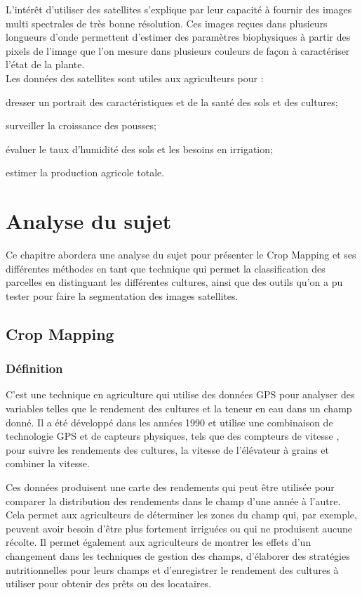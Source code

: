 \documentclass[12pt, openany]{report}
\begin{document}
L'intérêt d'utiliser des satellites s'explique par leur capacité à  fournir des images multi spectrales de très bonne résolution. Ces images reçues dans plusieurs longueurs d'onde permettent d'estimer des paramètres biophysiques à partir des pixels de l'image que l'on mesure dans plusieurs couleurs de façon à caractériser l'état de la plante.\\
Les données des satellites sont utiles aux agriculteurs pour :
\begin{mylist}
\item dresser un portrait des caractéristiques et de la santé des sols et des cultures;
\item surveiller la croissance des pousses;

\item évaluer le taux d'humidité des sols et les besoins en irrigation;
\item estimer la production agricole totale.
\end{mylist}



\chapter{Analyse du sujet}


Ce chapitre abordera une analyse du sujet pour présenter le Crop Mapping et ses différentes méthodes en tant que technique qui permet la classification des parcelles en distinguant les différentes cultures, ainsi que des outils qu’on a pu tester pour faire la segmentation des images satellites. 

\newpage
\section{Crop Mapping}
\subsection{Définition}
C’est une technique en agriculture qui utilise des données GPS pour analyser des variables telles que le rendement des cultures et la teneur en eau dans un champ donné. Il a été développé dans les années 1990 et utilise une combinaison de technologie GPS et de capteurs physiques, tels que des compteurs de vitesse , pour suivre les rendements des cultures, la vitesse de l'élévateur à grains et combiner la vitesse.
\par
Ces données produisent une carte des rendements qui peut être utilisée pour comparer la distribution des rendements dans le champ d'une année à l'autre. Cela permet aux agriculteurs de déterminer les zones du champ qui, par exemple, peuvent avoir besoin d'être plus fortement irriguées ou qui ne produisent aucune récolte. Il permet également aux agriculteurs de montrer les effets d'un changement dans les techniques de gestion des champs, d'élaborer des stratégies nutritionnelles pour leurs champs et d'enregistrer le rendement des cultures à utiliser pour obtenir des prêts ou des locataires.
\end{document}
